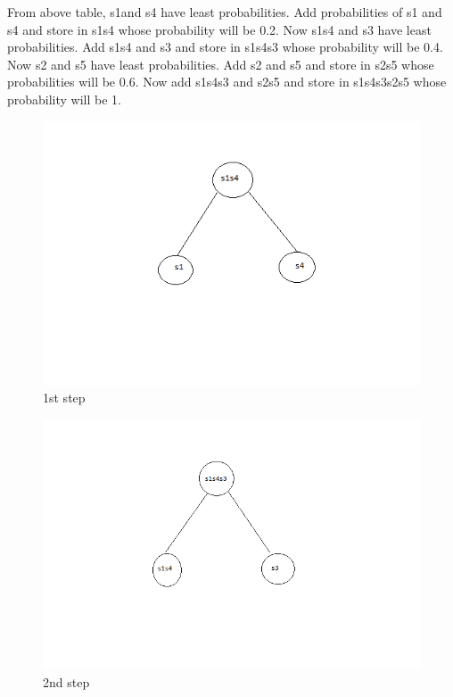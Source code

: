 \documentclass[10pt,a4paper]{article}
\begin{document}
From above table, s1and s4 have least probabilities. Add probabilities of s1 and s4 and store in s1s4 whose probability will be 0.2. Now s1s4 and s3 have least probabilities. Add s1s4 and s3 and store in s1s4s3 whose probability will be 0.4. Now s2 and s5 have least probabilities. Add s2 and s5 and store in s2s5 whose probabilities will be 0.6. Now add s1s4s3 and s2s5 and store in s1s4s3s2s5 whose probability will be 1. 
\begin{figure}[H]
    	\includegraphics[scale=0.9]{eg1}
    	\caption{1st step}
    	\label{huffman1}
\end{figure}
\hfill
\begin{figure}[H]
	\includegraphics[scale=0.9]{eg2}
	\caption{2nd step}
	\label{huffman2}
\end{figure}
\hfill
\end{document}
